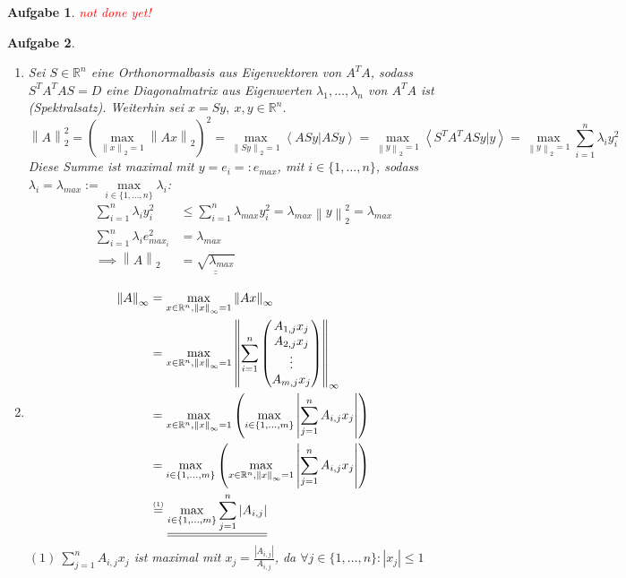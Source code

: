\documentclass[11pt]{article}
\theoremstyle{break}
\newtheorem{task}{Aufgabe}
\newcommand{\set}[1]{\ensuremath{\{#1\}}}
\newcommand{\abs}[1]{\ensuremath{\left\vert #1 \right\vert}}
\newcommand{\norm}[1]{\ensuremath{\left\| #1 \right\|}}
\newcommand{\skal}[2]{\ensuremath{\left\langle #1 | #2 \right\rangle}}
\newcommand{\R}{\ensuremath{\mathbb{R}}}
\newcommand{\ndy}{
    \textcolor{red} {\hfill not done yet!}
    \reversemarginpar
    \marginpar{\raggedleft\textcolor{red}{\rule{2mm}{2mm}}}
}
\begin{document}
\begin{task}
    \ndy
\end{task}

\begin{task}
    \hfill\vspace{-5mm}
    \begin{enumerate} [label={(\alph*)}]
        \item Sei $S\in \R^n$ eine Orthonormalbasis aus Eigenvektoren von $A^TA$, sodass $S^TA^TAS=D$ eine Diagonalmatrix aus Eigenwerten $\lambda_1, \dots, \lambda_n$ von $A^TA$ ist (Spektralsatz). Weiterhin sei $x = Sy,\ x,y\in\R^n$.
        $$\norm{A}_2^2 = (\max\limits_{\norm{x}_2 = 1} \norm{Ax}_2)^2 = \max\limits_{\norm{Sy}_2 = 1} \skal{ASy}{ASy} = \max\limits_{\norm{y}_2 = 1} \skal{S^TA^TASy}{y} = \max\limits_{\norm{y}_2 = 1} \sum\limits_{i=1}^n \lambda_i y_i^2$$
        Diese Summe ist maximal mit $y=e_i=:e_{max}$, mit $i\in \set{1,\dots, n}$, sodass $\lambda_i = \lambda_{max} := \max\limits_{i\in\set{1,\dots,n}} \lambda_i$:
        \begin{align*}
            \sum\limits_{i=1}^n \lambda_i y_i^2&\leq \sum\limits_{i=1}^n \lambda_{max} y_i^2 = \lambda_{max} \norm{y}_2^2 = \lambda_{max}\\
            \sum\limits_{i=1}^n \lambda_i e_{max_i}^2 &= \lambda_{max}\\
            \implies \norm{A}_2 &= \underline{\underline{\sqrt{\lambda_{max}}}}
        \end{align*}
        \item \begin{align*}
            \norm{A}_\infty &= \max\limits_{x\in \R^n, \norm{x}_\infty = 1}\norm{Ax}_\infty\\
            &= \max\limits_{x\in \R^n, \norm{x}_\infty = 1}\norm{\sum\limits_{i=1}^n\left(
            \begin{matrix}
                A_{1,j}x_j\\
                A_{2,j}x_j\\
                \vdots\\
                A_{m,j}x_j
            \end{matrix}
            \right)}_\infty\\
            &= \max\limits_{x\in \R^n, \norm{x}_\infty = 1}\left(\max\limits_{i\in\set{1,\dots,m}}\abs{\sum\limits_{j=1}^n A_{i,j}x_j}\right)\\
            &= \max\limits_{i\in\set{1,\dots,m}}\left(\max\limits_{x\in \R^n, \norm{x}_\infty = 1}\abs{\sum\limits_{j=1}^n A_{i,j}x_j}\right)\\
            &\stackrel{\mbox{\tiny (1)}}{=} \underline{\underline{\max\limits_{i\in\set{1,\dots,m}}\sum\limits_{j=1}^n \abs{A_{i,j}}}}
        \end{align*}
        $(1)\ \sum\limits_{j=1}^n A_{i,j}x_j$ ist maximal mit $x_j = \frac{\abs{A_{i,j}}}{A_{i,j}}$, da $\forall j\in\set{1,\dots,n}:\abs{x_j}\leq 1$
    \end{enumerate}
\end{task}
\end{document}
